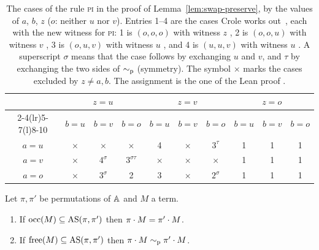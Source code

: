\begin{table}[pos=b]
\caption{The cases of the rule \textsc{pi} in the proof of
Lemma~\ref{lem:swap-preserve}, by the values of $a$, $b$, $z$ ($o$:
neither $u$ nor $v$). Entries 1--4 are the cases Crole works
out~\cite[pp.~14--15]{crole2012a}, each with the new witness for
\textsc{pi}: 1 is $(o, o, o)$ with witness $z$
,
2 is $(o, o, u)$ with witness $v$
,
3 is $(o, u, v)$ with witness $u$
,
and 4 is $(u, u, v)$ with witness $u$
.
A superscript $\sigma$
means that the case follows by exchanging $u$ and $v$, and $\tau$ by
exchanging the two sides of $\sim_{\mathrm{p}}$ (symmetry). The symbol $\times$
marks the cases excluded by $z \neq a, b$. The assignment is the one
of the Lean proof
.}
\label{tab:lemma61}
\small
\begin{tabular}{@{}c@{\quad}ccc@{\quad}ccc@{\quad}ccc@{}}
\toprule
 & \multicolumn{3}{c}{$z = u$} & \multicolumn{3}{c}{$z = v$}
 & \multicolumn{3}{c}{$z = o$} \\
\cmidrule(lr){2-4}\cmidrule(lr){5-7}\cmidrule(l){8-10}
 & $b = u$ & $b = v$ & $b = o$ & $b = u$ & $b = v$ & $b = o$
 & $b = u$ & $b = v$ & $b = o$ \\
\midrule
$a = u$ & $\times$ & $\times$ & $\times$
        & 4 & $\times$ & $3^{\tau}$ & 1 & 1 & 1 \\
$a = v$ & $\times$ & $4^{\sigma}$ & $3^{\sigma\tau}$
        & $\times$ & $\times$ & $\times$ & 1 & 1 & 1 \\
$a = o$ & $\times$ & $3^{\sigma}$ & 2
        & 3 & $\times$ & $2^{\sigma}$ & 1 & 1 & 1 \\
\bottomrule
\end{tabular}
\end{table}

\begin{lemma}
\label{lem:agreement}
Let $\pi, \pi'$ be permutations of $\mathbb{A}$ and $M$ a term.
\begin{enumerate}
  \item {}
    If $\mathrm{occ}(M) \subseteq \mathrm{AS}(\pi, \pi')$ then
    $\pi \cdot M = \pi' \cdot M$.
  \item {}
    If $\mathrm{free}(M) \subseteq \mathrm{AS}(\pi, \pi')$ then
    $\pi \cdot M \sim_{\mathrm{p}} \pi' \cdot M$.
\end{enumerate}
\end{lemma}

